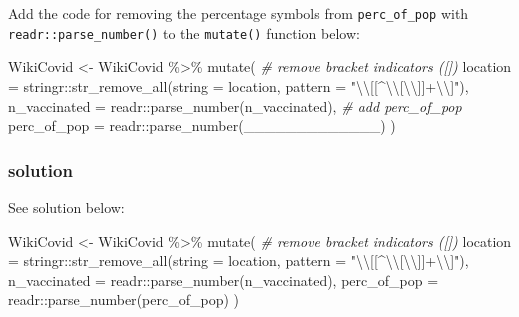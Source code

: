 \documentclass[11pt,]{article}
\newenvironment{Shaded}{\begin{snugshade}}{\end{snugshade}}
\newcommand{\AttributeTok}[1]{\textcolor[rgb]{0.77,0.63,0.00}{#1}}
\newcommand{\CommentTok}[1]{\textcolor[rgb]{0.56,0.35,0.01}{\textit{#1}}}
\newcommand{\FunctionTok}[1]{\textcolor[rgb]{0.00,0.00,0.00}{#1}}
\newcommand{\NormalTok}[1]{#1}
\newcommand{\OtherTok}[1]{\textcolor[rgb]{0.56,0.35,0.01}{#1}}
\newcommand{\SpecialCharTok}[1]{\textcolor[rgb]{0.00,0.00,0.00}{#1}}
\newcommand{\StringTok}[1]{\textcolor[rgb]{0.31,0.60,0.02}{#1}}
\let\oldShaded\Shaded
\let\endoldShaded\endShaded
\renewenvironment{Shaded}{\footnotesize\oldShaded}{\endoldShaded}
\begin{document}
Add the code for removing the percentage symbols from
\texttt{perc\_of\_pop} with \texttt{readr::parse\_number()} to the
\texttt{mutate()} function below:

\begin{Shaded}
\begin{Highlighting}[]
\NormalTok{WikiCovid }\OtherTok{\textless{}{-}}\NormalTok{ WikiCovid }\SpecialCharTok{\%\textgreater{}\%}
  \FunctionTok{mutate}\NormalTok{(}
    \CommentTok{\# remove bracket indicators ([])}
    \AttributeTok{location =}\NormalTok{ stringr}\SpecialCharTok{::}\FunctionTok{str\_remove\_all}\NormalTok{(}\AttributeTok{string =}\NormalTok{ location, }
                                       \AttributeTok{pattern =} \StringTok{"}\SpecialCharTok{\textbackslash{}\textbackslash{}}\StringTok{[[\^{}}\SpecialCharTok{\textbackslash{}\textbackslash{}}\StringTok{[}\SpecialCharTok{\textbackslash{}\textbackslash{}}\StringTok{]]+}\SpecialCharTok{\textbackslash{}\textbackslash{}}\StringTok{]"}\NormalTok{), }
    \AttributeTok{n\_vaccinated =}\NormalTok{ readr}\SpecialCharTok{::}\FunctionTok{parse\_number}\NormalTok{(n\_vaccinated), }
    \CommentTok{\# add perc\_of\_pop}
    \AttributeTok{perc\_of\_pop =}\NormalTok{ readr}\SpecialCharTok{::}\FunctionTok{parse\_number}\NormalTok{(\_\_\_\_\_\_\_\_\_\_\_\_\_)}
\NormalTok{  )}
\end{Highlighting}
\end{Shaded}

\hypertarget{solution-5}{%
\subsubsection{solution}\label{solution-5}}

See solution below:

\begin{Shaded}
\begin{Highlighting}[]
\NormalTok{WikiCovid }\OtherTok{\textless{}{-}}\NormalTok{ WikiCovid }\SpecialCharTok{\%\textgreater{}\%}
  \FunctionTok{mutate}\NormalTok{(}
    \CommentTok{\# remove bracket indicators ([])}
    \AttributeTok{location =}\NormalTok{ stringr}\SpecialCharTok{::}\FunctionTok{str\_remove\_all}\NormalTok{(}\AttributeTok{string =}\NormalTok{ location, }
                                       \AttributeTok{pattern =} \StringTok{"}\SpecialCharTok{\textbackslash{}\textbackslash{}}\StringTok{[[\^{}}\SpecialCharTok{\textbackslash{}\textbackslash{}}\StringTok{[}\SpecialCharTok{\textbackslash{}\textbackslash{}}\StringTok{]]+}\SpecialCharTok{\textbackslash{}\textbackslash{}}\StringTok{]"}\NormalTok{), }
    \AttributeTok{n\_vaccinated =}\NormalTok{ readr}\SpecialCharTok{::}\FunctionTok{parse\_number}\NormalTok{(n\_vaccinated), }
    \AttributeTok{perc\_of\_pop =}\NormalTok{ readr}\SpecialCharTok{::}\FunctionTok{parse\_number}\NormalTok{(perc\_of\_pop)}
\NormalTok{  )}
\end{Highlighting}
\end{Shaded}
\end{document}
